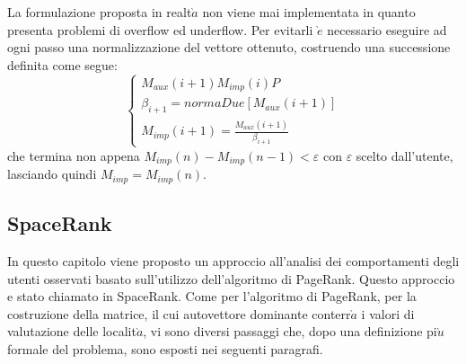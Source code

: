 La formulazione proposta in realt$\grave{a}$ non viene mai implementata in quanto
presenta problemi di overflow ed underflow. Per evitarli $\grave{e}$ necessario
eseguire ad ogni passo una normalizzazione del vettore ottenuto, costruendo
una successione definita come segue:
\begin{equation}
\left\{\begin{matrix}
M_{aux}(i+1) M_{imp}(i)P
\\ \beta_{i+1} = normaDue[M_{aux}(i+1)]
\\ M_{imp}(i+1) = \frac{M_{aux}(i+1)}{\beta_{i+1}}
\end{matrix}\right.
\end{equation}
che termina non appena $ M_{imp}(n) - M_{imp}(n- 1) < \varepsilon $ con $ \varepsilon $ scelto dall'utente,
lasciando quindi $ M_{imp} = M_{imp}(n) $.

\subsection{SpaceRank}
In questo capitolo viene proposto un approccio all'analisi dei comportamenti
degli utenti osservati basato sull'utilizzo dell'algoritmo di PageRank. Questo
approccio e stato chiamato in \cite{cit_49} SpaceRank. Come per l'algoritmo di PageRank,
per la costruzione della matrice, il cui autovettore dominante conterr$\grave{a}$
i valori di valutazione delle localit$\grave{a}$, vi sono diversi passaggi che, dopo una
definizione pi$\grave{u}$ formale del problema, sono esposti nei seguenti paragrafi.

